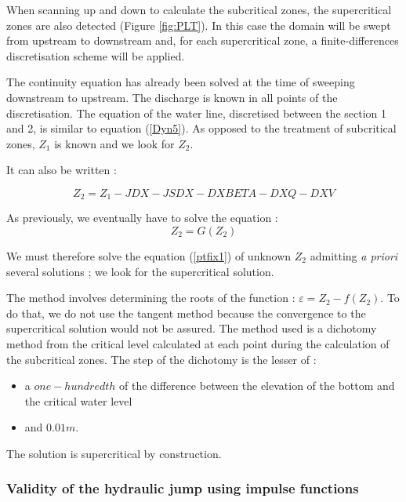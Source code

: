 When scanning up and down to calculate the subcritical zones, the supercritical zones are also detected (Figure \ref{fig:PLT}). In this case the domain will be swept from upstream to downstream and, for each supercritical zone, a finite-differences discretisation scheme will be applied.

The continuity equation has already been solved at the time of sweeping downstream to upstream. The discharge is known in all points of the discretisation. The equation of the water line, discretised between the section 1 and 2, is similar to equation (\ref{Dyn5}). As opposed to the treatment of subcritical zones, $Z_1$ is known and we look for $Z_2$.

It can also be written :

\begin{equation}
  Z_2 = Z_1 - JDX - JSDX - DXBETA - DXQ - DXV
\end{equation}

As previously, we eventually have to solve the equation :
\begin{equation}
  \label{ptfix1}
  Z_2 = G(Z_2)
\end{equation}

We must therefore solve the equation (\ref{ptfix1}) of unknown $Z_2$ admitting \textit{a priori} several solutions ; we look for the supercritical solution.

The method involves determining the roots of the function : $\varepsilon = Z_2 - f(Z_2)$.
To do that, we do not use the tangent method because the convergence to the supercritical solution would not be assured. The method used is a dichotomy method from the critical level calculated at each point during the calculation of the subcritical zones. The step of the dichotomy is the lesser of :
\begin{itemize}
 \item a $one-hundredth$ of the difference between the elevation of the bottom and the critical water level
 \item and $0.01 m$.
\end{itemize}

The solution is supercritical by construction.

\subsubsection{Validity of the hydraulic jump using impulse functions}

